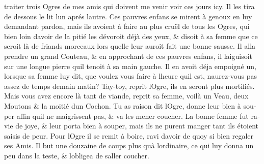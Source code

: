 \documentclass[14pt,a4paper]{memoir}
\begin{document}
\begin{otherlanguage}{french}
traiter trois Ogres de mes amis qui doivent me venir voir ces jours icy.
Il les tira de dessous le lit l\textquotesingle un aprés
l\textquotesingle autre. Ces pauvres enfans se mirent à genoux en luy
demandant pardon, mais ils avoient à faire au plus cruël de tous les
Ogres, qui bien loin d\textquotesingle avoir de la pitié les dévoroit
déjà des yeux, \& disoit à sa femme que ce seroit là de friands morceaux
lors qu\textquotesingle elle leur auroit fait une bonne sausse. Il alla
prendre un grand Couteau, \& en approchant de ces pauvres enfans, il
l\textquotesingle aiguisoit sur une longue pierre qu\textquotesingle il
tenoit à sa main gauche. Il en avoit déja empoigné un, lorsque sa femme
luy dit, que voulez vous faire à l\textquotesingle heure
qu\textquotesingle il est, n\textquotesingle aurez-vous pas assez de
temps demain matin? Tay-toy, reprit l\textquotesingle Ogre, ils en
seront plus mortifiés. Mais vous avez encore là tant de viande, reprit
sa femme, voilà un Veau, deux Moutons \& la moitié d\textquotesingle un
Cochon. Tu as raison dit l\textquotesingle Ogre, donne leur bien à
souper affin qu\textquotesingle il ne maigrissent pas, \& va les mener
coucher. La bonne femme fut ravie de joye, \& leur porta bien à souper,
mais ils ne purent manger tant ils étoient saisis de peur. Pour
l\textquotesingle Ogre il se remit à boire, ravi d\textquotesingle avoir
de quoy si bien regaler ses Amis. Il but une douzaine de coups plus
qu\textquotesingle à l\textquotesingle ordinaire, ce qui luy donna un
peu dans la teste, \& l\textquotesingle obligea de
s\textquotesingle aller coucher.


\end{otherlanguage}
\end{document}
